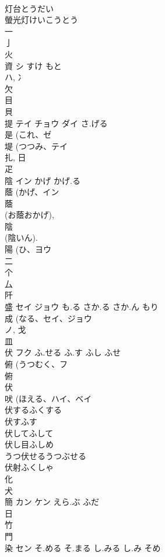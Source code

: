 \documentclass[8pt]{extreport}
\begin{document}
\begin{CJK}{UTF8}{min}
\\	灯台とうだい 
\\	螢光灯けいこうとう 
\\	一 
\\	亅 
\\	火 
\\	資	シ	すけ もと	
\\	ハ, 冫 
\\	欠 
\\	目 
\\	貝 
\\	提	テイ チョウ ダイ	さ.げる	
\\	是 (これ、ゼ 
\\	堤 (つつみ、テイ 
\\	扎, 日 
\\	疋 
\\	陰	イン	かげ かげ.る	
\\	蔭 (かげ、イン 
\\	蔭 
\\	(お蔭おかげ), 
\\	陰 
\\	(陰いん). 
\\	陽 (ひ、ヨウ 
\\	二 
\\	个 
\\	厶 
\\	阡	
\\	盛	セイ ジョウ	も.る さか.る さか.ん もり	
\\	成 (なる、セイ、ジョウ 
\\	ノ, 戈 
\\	皿 
\\	伏	フク	ふ.せる ふ.す ふし ふせ	
\\	俯 (うつむく、フ 
\\	俯 
\\	伏 
\\	吠 (ほえる、ハイ、ベイ 
\\	伏するふくする
\\	伏すふす
\\	伏してふして
\\	伏し目ふしめ
\\	うつ伏せるうつぶせる
\\	伏射ふくしゃ
\\	化 
\\	犬 
\\	簡	カン ケン	えら.ぶ ふだ	
\\	日 
\\	竹 
\\	門 
\\	染	セン	そ.める そ.まる し.みる し.み そめ	

\end{CJK}
\end{document}
